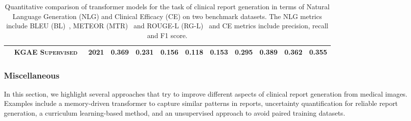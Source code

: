 \documentclass[10pt,journal,compsoc]{IEEEtran}
\begin{document}
\begin{table}
{\begin{tabular}{|c|l|l|llllll|lll|}
                                  & \textsc{KGAE Supervised~\cite{liu2021auto}}                                    & 2021                           & 0.369                    & 0.231                    & 0.156                   & 0.118                   & 0.153                   & 0.295                     & 0.389                     & 0.362                    & 0.355                       \\  
\hline
\end{tabular}
}
\caption{Quantitative comparison of transformer models for the task of clinical report generation in terms of Natural Language Generation (NLG) and Clinical Efficacy (CE) on two benchmark datasets. The NLG metrics include BLEU (BL)~\cite{papineni2002bleu}, METEOR (MTR)~\cite{denkowski2011meteor} and ROUGE-L (RG-L)~\cite{rouge2004package} and CE metrics include precision, recall and F1 score.}
\label{tab:report_gen}
\end{table}

\subsubsection{{{\textbf{Miscellaneous}}}}
In this section, we highlight several approaches that try to improve different aspects of clinical report generation from medical images. Examples include a memory-driven transformer to capture similar patterns in reports, uncertainty quantification for reliable report generation, a curriculum learning-based method, and an unsupervised approach to avoid paired training datasets.
\end{document}
